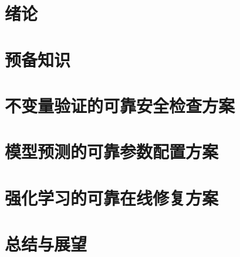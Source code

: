\documentclass{xdupgthesis}
\begin{document}
\frontmatter

\mainmatter

\chapter{绪论}


\chapter{预备知识}


\chapter{不变量验证的可靠安全检查方案}


\chapter{模型预测的可靠参数配置方案}


\chapter{强化学习的可靠在线修复方案}


\chapter{总结与展望}


\backmatter
\end{document}
